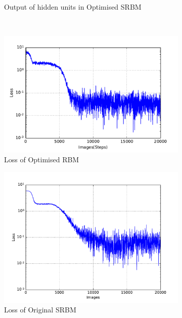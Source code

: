 \begin{figure}
\begin{subfigure}[t]{0.32\textwidth}
		\caption{Output of hidden units in Optimised SRBM}
	\end{subfigure}\\
	\begin{subfigure}[t]{0.32\textwidth}
		\includegraphics[width=\textwidth]{pics_sdlm/31_exp_RBM_noise/exp3_loss_s_2.pdf}
		\caption{Loss of Optimised RBM}
	\end{subfigure}
	\begin{subfigure}[t]{0.32\textwidth}
		\includegraphics[width=\textwidth]{pics_sdlm/10_exp_SRBM_Orig/exp3_mse_nons_2.pdf}
		\caption{Loss of Original SRBM}
	\end{subfigure}
	\begin{subfigure}[t]{0.32\textwidth}

\end{subfigure}
\end{figure}
